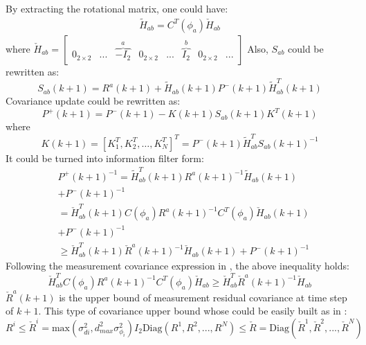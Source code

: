 \documentclass[conference]{IEEEtran}
\begin{document}
By extracting the rotational matrix, one could have:
\begin{equation}
\begin{split}
	\tilde{H}_{ab} = C^T(\phi_a)\check{H}_{ab}
\end{split}
\end{equation}
where $\check{H}_{ab} = \begin{bmatrix}
0_{2\times2} &... &\overbrace{-I_2}^a &0_{2\times2}&...&\overbrace{I_2}^b & 0_{2\times2} & ...
\end{bmatrix}$
Also, $S_{ab}$ could be rewritten as:
\begin{equation}
S_{ab}(k+1) = R^a(k+1) + \tilde{H}_{ab}(k+1)P^-(k+1)\tilde{H}^T_{ab}(k+1)
\end{equation}
Covariance update could be rewritten as:
\begin{equation}
	P^+(k+1) = P^-(k+1) - K(k+1)S_{ab}(k+1)K^T(k+1)
\end{equation}
where
\begin{equation*}
K(k+1) = [K_1^T,K_2^T,\dots,K_N^T]^T = P^-(k+1)\tilde{H}^T_{ab}S_{ab}(k+1)^{-1}
\end{equation*}
It could be turned into information filter form:
\begin{equation*}
\begin{split}
&P^+(k+1)^{-1} = \tilde{H}^T_{ab}(k+1)R^a(k+1)^{-1}\tilde{H}_{ab}(k+1) \\&+ P^-(k+1)^{-1}
\\&=\check{H}^T_{ab}(k+1)C(\phi_a)R^a(k+1)^{-1}C^T(\phi_a)\check{H}_{ab}(k+1) \\&+ P^-(k+1)^{-1}
\\& \geq\check{H}^T_{ab}(k+1)\check{R}^a(k+1)^{-1}\check{H}_{ab}(k+1) + P^-(k+1)^{-1}
\end{split}
\end{equation*}
Following the measurement covariance expression in \cite{chang2018optimal,mourikis2004analysisa,mourikis2006performance}, the above inequality holds:
\begin{equation*}
\check{H}^T_{ab}C(\phi_a){R^a}(k+1)^{-1}C^T(\phi_a)\check{H}_{ab} \geq \check{H}^T_{ab}\check{R}^a(k+1)^{-1}\check{H}_{ab}
\end{equation*}
$\check{R}^a(k+1)$ is the upper bound of measurement residual covariance at time step of $k+1$.
This type of covariance upper bound whose could be easily built as in \cite{chang2018optimal,mourikis2006performance}:
\begin{subequations}
	\begin{equation}
	R^i \leq \check{R}^i = \text{max}(\sigma_{di}^2,d_{max}^2\sigma_{\phi_i}^2) I_2
	\end{equation}
	\begin{equation}
	\text{Diag}(R^1,R^2,...,R^N)\leq \check{R} = \text{Diag}(\check{R}^1,\check{R}^2,...,\check{R}^N)
	\end{equation}
\end{subequations}
\end{document}
